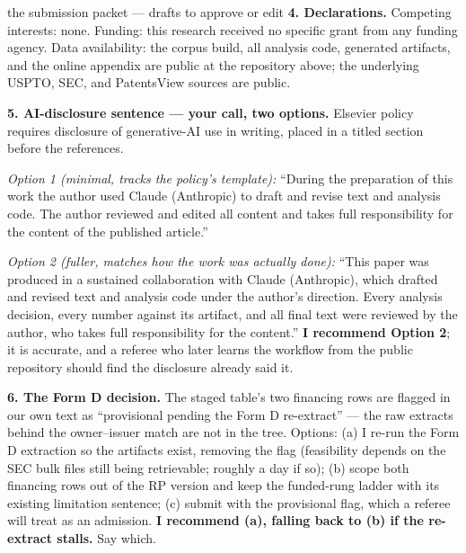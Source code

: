 \begin{ericbox}{the submission packet --- drafts to approve or edit}
\medskip\noindent\textbf{4. Declarations.} Competing interests: none.
Funding: this research received no specific grant from any funding agency.
Data availability: the corpus build, all analysis code, generated
artifacts, and the online appendix are public at the repository above; the
underlying USPTO, SEC, and PatentsView sources are public.

\medskip\noindent\textbf{5. AI-disclosure sentence --- your call, two
options.} Elsevier policy requires disclosure of generative-AI use in
writing, placed in a titled section before the references.

\emph{Option 1 (minimal, tracks the policy's template):} ``During the
preparation of this work the author used Claude (Anthropic) to draft and
revise text and analysis code. The author reviewed and edited all content
and takes full responsibility for the content of the published article.''

\emph{Option 2 (fuller, matches how the work was actually done):} ``This
paper was produced in a sustained collaboration with Claude (Anthropic),
which drafted and revised text and analysis code under the author's
direction. Every analysis decision, every number against its artifact, and
all final text were reviewed by the author, who takes full responsibility
for the content.'' \textbf{I recommend Option 2}; it is accurate, and a
referee who later learns the workflow from the public repository should
find the disclosure already said it.

\medskip\noindent\textbf{6. The Form D decision.} The staged table's two
financing rows are flagged in our own text as ``provisional pending the
Form D re-extract'' --- the raw extracts behind the owner--issuer match
are not in the tree. Options: (a) I re-run the Form D extraction so the
artifacts exist, removing the flag (feasibility depends on the SEC bulk
files still being retrievable; roughly a day if so); (b) scope both
financing rows out of the RP version and keep the funded-rung ladder with
its existing limitation sentence; (c) submit with the provisional flag,
which a referee will treat as an admission. \textbf{I recommend (a),
falling back to (b) if the re-extract stalls.} Say which.
\end{ericbox}

